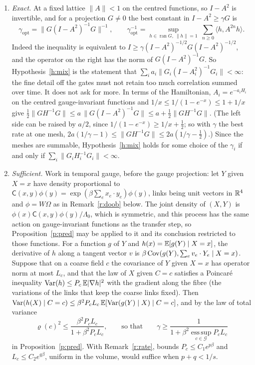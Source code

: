 \begin{remark}\label{r:forms}
\leavevmode
\begin{enumerate}
\item[(a)] \emph{Exact.} At a fixed lattice $\|A\|<1$ on the centred functions, so $I-A^2$ is invertible, and
for a projection $G\ne0$ the best constant in $I-A^2\ge\gamma G$ is
\[
\gamma_{\mathrm{opt}}=\big\|G(I-A^2)^{-1}G\big\|^{-1},\qquad
\gamma_{\mathrm{opt}}^{-1}=\sup_{h\in\operatorname{ran}G,\ \|h\|=1}\ \sum_{n\ge0}\langle h,A^{2n}h\rangle .
\]
Indeed the inequality is equivalent to $I\ge\gamma(I-A^2)^{-1/2}G(I-A^2)^{-1/2}$, and the operator on the
right has the norm of $G(I-A^2)^{-1}G$. So Hypothesis~\ref{h:mix} is the statement that
$\sum_ia_i\|G_i(I-A_i^2)^{-1}G_i\|<\infty$: the fine detail off the gates must not retain too much
correlation summed over time. It does not ask for more. In terms of the Hamiltonian, $A_i=e^{-a_iH_i}$ on the
centred gauge-invariant functions and $1/x\le1/(1-e^{-x})\le1+1/x$ give
$\tfrac12\|GH^{-1}G\|\le a\,\|G(I-A^2)^{-1}G\|\le a+\tfrac12\|GH^{-1}G\|$. (The left side can be raised by
$a/2$, since $1/(1-e^{-x})\ge1/x+\tfrac12$; so with $\gamma$ the best rate at one mesh,
$2a(1/\gamma-1)\le\|GH^{-1}G\|\le2a(1/\gamma-\tfrac12)$.) Since the meshes are summable,
Hypothesis~\ref{h:mix} holds for some choice of the $\gamma_i$ if and only if
$\sum_i\|G_iH_i^{-1}G_i\|<\infty$.
\item[(b)] \emph{Sufficient.} Work in temporal gauge, before the gauge projection: let $Y$ given $X=x$ have
density proportional to $\mathsf C(x,y)\phi(y)=\exp(\beta\sum_ex_e\cdot y_e)\phi(y)$, links being unit vectors in
$\mathbb{R}^4$ and $\phi=W\Omega$ as in Remark~\ref{r:doob} below. The joint density of $(X,Y)$ is
$\phi(x)\mathsf C(x,y)\phi(y)/\Lambda_0$, which is symmetric, and this process has the same action on
gauge-invariant functions as the transfer step, so Proposition~\ref{p:pred} may be applied to it and its
conclusion restricted to those functions. For a function $g$
of $Y$ and $h(x)=\mathbb{E}[g(Y)\mid X=x]$, the derivative of $h$ along a tangent vector $v$ is
$\beta\operatorname{Cov}(g(Y),\sum_ev_e\cdot Y_e\mid X=x)$. Suppose that on a coarse field $c$ the covariance of $Y$ given
$X=x$ has operator norm at most $L_c$, and that the law of $X$ given $C=c$ satisfies a Poincar\'e inequality
$\operatorname{Var}(h)\le P_c\,\mathbb{E}|\nabla h|^2$ with the gradient along the fibre (the variations of the
links that keep the coarse links fixed). Then
$\operatorname{Var}(h(X)\mid C=c)\le\beta^2P_cL_c\,\mathbb{E}[\operatorname{Var}(g(Y)\mid X)\mid C=c]$, and by the
law of total variance
\[
\varrho(c)^2\le\frac{\beta^2P_cL_c}{1+\beta^2P_cL_c},\qquad\text{so that}\qquad
\gamma\ge\frac1{1+\beta^2\operatorname*{ess\,sup}_{c\in\mathcal G}P_cL_c}
\]
in Proposition~\ref{p:pred}. With Remark~\ref{r:rate}, bounds $P_c\le C_1e^{p\beta}$ and
$L_c\le C_2e^{q\beta}$, uniform in the volume, would suffice when $p+q<1/s$.


\end{enumerate}
\end{remark}
